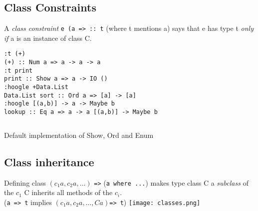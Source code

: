 \documentclass{article}
\newcommand{\Haskell}[1]{\texttt{#1}}
\begin{document}
\subsection{Class Constraints}
A \emph{class constraint} \Haskell{e (a => :: t} (where t mentions a) says that e has type t \emph{only if} a is an instance of class C.\\
\begin{verbatim}
:t (+)
(+) :: Num a => a -> a -> a
:t print
print :: Show a => a -> IO ()
:hoogle +Data.List
Data.List sort :: Ord a => [a] -> [a]
:hoogle [(a,b)] -> a -> Maybe b
lookup :: Eq a => a -> a [(a,b)] -> Maybe b
\end{verbatim}
\begin{listing}[h!]
\inputminted{Haskell}{type-classes.hs}
\caption{Default implementation of Show, Ord and Enum}
\end{listing}
\subsection{Class inheritance}
Defining class $(c_1a,c_2a,\ldots)$ \Haskell{=>} (\Haskell{a where ...}) makes type class C a \emph{subclass} of the $c_1$ C inherits all methods of the $c_i$.\\
(\Haskell{a => t} implies $(c_1a,c_2a,\ldots,Ca)$\Haskell{=> t})
\clearpage
\texttt{[image: classes.png]}
\newpage
\end{document}
